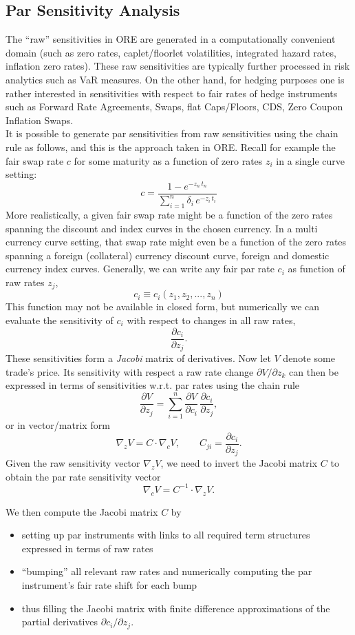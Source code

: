 \documentclass[12pt, a4paper]{article}
\begin{document}
{\begin{appendix}
\subsection{Par Sensitivity Analysis}
\label{app:par_sensi}

The ``raw'' sensitivities in ORE are generated in a computationally convenient domain (such as zero rates, caplet/floorlet volatilities, integrated hazard rates, inflation zero rates). These raw sensitivities are typically further processed in risk analytics such as VaR measures. On the other hand, for hedging purposes one is rather interested in sensitivities with respect to fair rates of hedge instruments such as Forward Rate Agreements, Swaps, flat Caps/Floors, CDS, Zero Coupon Inflation Swaps. \\

It is possible to generate par sensitivities from raw sensitivities using the chain rule as follows, and this is the approach taken in ORE. Recall for example the fair swap rate $c$ for some maturity as a function of zero rates $z_i$ in a single curve setting:
$$
c = \frac{1 - e^{-z_n\,t_n}}{\sum_{i=1}^n \delta_i\,e^{-z_i\, t_i}}
$$
More realistically, a given fair swap rate might be a function of the zero rates spanning the discount and index curves in the chosen currency. In a multi currency curve setting, that swap rate might even be a function of the zero rates spanning a foreign (collateral) currency discount curve, foreign and domestic currency index curves. Generally, we can write any fair par rate $c_i$ as function of raw rates $z_j$,
$$
c_i \equiv c_i(z_1, z_2, ..., z_n)
$$
This function may not be available in closed form, but numerically we can evaluate the sensitivity of $c_i$ with respect to changes in all raw rates,
$$
\frac{\partial c_i}{\partial z_j}.
$$
These sensitivities form a {\em Jacobi} matrix of derivatives. Now let $V$ denote some trade's price. Its sensitivity with respect a raw rate change $\partial V/\partial z_k$ can then be expressed in terms of sensitivities w.r.t. par rates using the chain rule
$$
\frac{\partial V}{\partial z_j} = \sum_{i=1}^n \frac{\partial V}{\partial c_i}\,\frac{\partial c_i}{\partial z_j},
$$
or in vector/matrix form
$$
\nabla_z V = C \cdot \nabla_c V, \qquad C_{ji} = \frac{\partial c_i}{\partial z_j}.
$$
Given the raw sensitivity vector $\nabla_z V$, we need to invert the Jacobi matrix $C$ to obtain the par rate sensitivity vector
$$
\nabla_c V = C^{-1} \cdot \nabla_z V.
$$

We then compute the Jacobi matrix $C$ by
\begin{itemize}
\item setting up par instruments with links to all required term structures expressed in terms of raw rates
\item ``bumping'' all relevant raw rates and numerically computing the par instrument's fair rate shift for each bump
\item thus filling the Jacobi matrix with finite difference approximations of the partial derivatives $\partial c_i/\partial z_j$.
\end{itemize}


\end{appendix}}
\end{document}
